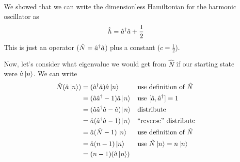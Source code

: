 	\begin{questions}
	
		\question We showed that we can write the dimensionless Hamiltonian for the harmonic oscillator as 
			\begin{equation*}
				\hat h = \hat a^\dag \hat a + \frac{1}{2}
			\end{equation*}
			This is just an operator ($\hat N = \hat a^\dag \hat a$) plus a constant ($c = \frac{1}{2}$).
			

		\contdnewpg
		\question Now, let's consider what eigenvalue we would get from $\hat N$ if our starting state were $\hat a \ket{n}$.  We can write
			\begin{align*}
				\hat N(\hat a \ket{n}) &= (\hat a^\dag \hat a)\hat a \ket{n} && \text{use definition of $\hat N$} \\
				 &= (\hat a \hat a^\dag - 1)\hat a \ket{n} && \text{use }[\hat a,\hat a^\dag] = 1 \\
				 &= (\hat a \hat a^\dag \hat a - \hat a)\ket{n} && \text{distribute}\\
				 &= \hat a(\hat a^\dag \hat a - 1)\ket{n} && \text{``reverse'' distribute}\\
				 &= \hat a(\hat N - 1)\ket{n} && \text{use definition of $\hat N$}\\
				 &= \hat a (n-1) \ket{n} && \text{use $\hat N \ket{n} = n\ket{n}$}\\
				 &= (n-1)(\hat a \ket{n})
			\end{align*}
			\begin{parts}

\end{parts}
\end{questions}
